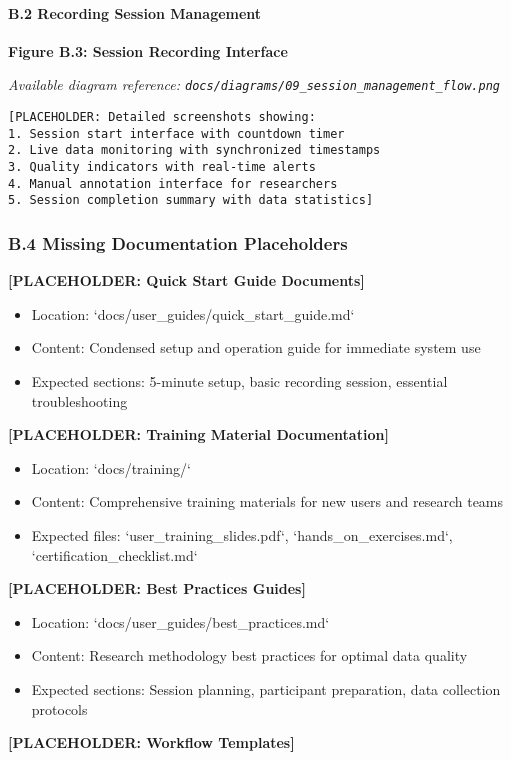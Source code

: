 \documentclass[12pt,a4paper]{article}
\begin{document}
\paragraph{B.2 Recording Session Management}

\textbf{Figure B.3: Session Recording Interface}

\textit{Available diagram reference: \texttt{docs/diagrams/09\_session\_management\_flow.png}}

\begin{verbatim}
[PLACEHOLDER: Detailed screenshots showing:
1. Session start interface with countdown timer
2. Live data monitoring with synchronized timestamps
3. Quality indicators with real-time alerts
4. Manual annotation interface for researchers
5. Session completion summary with data statistics]
\end{verbatim}

\subsubsection{B.4 Missing Documentation Placeholders}

\textbf{[PLACEHOLDER: Quick Start Guide Documents]}

\begin{itemize}
\item Location: `docs/user_guides/quick_start_guide.md`
\item Content: Condensed setup and operation guide for immediate system use
\item Expected sections: 5-minute setup, basic recording session, essential troubleshooting

\end{itemize}
\textbf{[PLACEHOLDER: Training Material Documentation]}

\begin{itemize}
\item Location: `docs/training/`
\item Content: Comprehensive training materials for new users and research teams
\item Expected files: `user_training_slides.pdf`, `hands_on_exercises.md`, `certification_checklist.md`

\end{itemize}
\textbf{[PLACEHOLDER: Best Practices Guides]}

\begin{itemize}
\item Location: `docs/user_guides/best_practices.md`
\item Content: Research methodology best practices for optimal data quality
\item Expected sections: Session planning, participant preparation, data collection protocols

\end{itemize}
\textbf{[PLACEHOLDER: Workflow Templates]}
\end{document}
